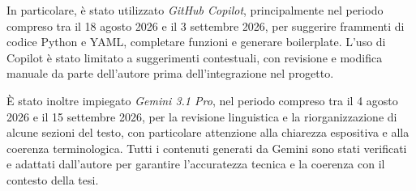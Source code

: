 \documentclass[12pt,a4paper,openright,twoside]{book}
\begin{document}
In particolare, è stato utilizzato \textit{GitHub Copilot}, principalmente nel periodo compreso tra il 18 agosto 2026 e il 3 settembre 2026, per suggerire frammenti di codice Python e YAML, completare funzioni e generare boilerplate. L'uso di Copilot è stato limitato a suggerimenti contestuali, con revisione e modifica manuale da parte dell'autore prima dell'integrazione nel progetto.

È stato inoltre impiegato \textit{Gemini 3.1 Pro}, nel periodo compreso tra il 4 agosto 2026 e il 15 settembre 2026, per la revisione linguistica e la riorganizzazione di alcune sezioni del testo, con particolare attenzione alla chiarezza espositiva e alla coerenza terminologica. Tutti i contenuti generati da Gemini sono stati verificati e adattati dall'autore per garantire l'accuratezza tecnica e la coerenza con il contesto della tesi.


\backmatter


\begingroup
\sloppy
\raggedright

\endgroup
\end{document}
